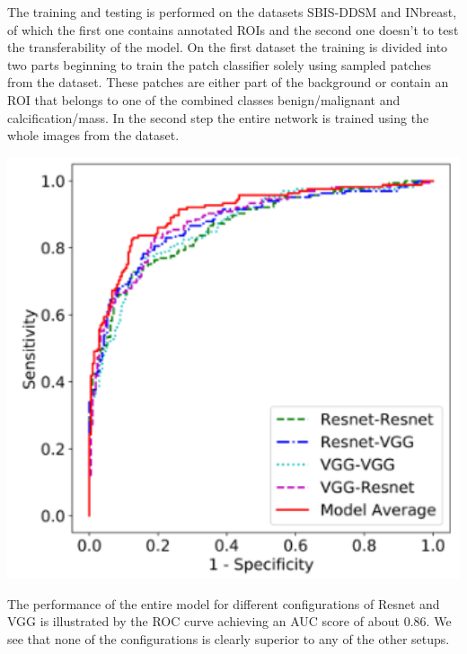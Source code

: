 \noindent
\begin{minipage}{0.5\textwidth}	
\noindent
The training and testing is performed on the datasets SBIS-DDSM and INbreast, of which the first one contains annotated ROIs and the second one doesn't to test the transferability of the model.
On the first dataset the training is divided into two parts beginning to train the patch classifier solely using sampled patches from the dataset. These patches are either part of the background or contain an ROI that belongs to one of the combined classes benign/malignant and calcification/mass. In the second step the entire network is trained using the whole images from the dataset.
\end{minipage}
\begin{minipage}[c]{0.5\textwidth}
	\centering
	\includegraphics[width=1\textwidth]{ML2}
	\label{fig2}		
\end{minipage}
The performance of the entire model for different configurations of Resnet and VGG is illustrated by the ROC curve achieving an AUC score of about 0.86. We see that none of the configurations is clearly superior to any of the other setups. 

